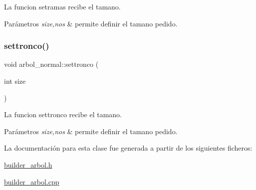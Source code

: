 La funcion setramas recibe el tamano. 
\begin{DoxyParams}{Parámetros}
{\em size,nos} & permite definir el tamano pedido. \\
\hline
\end{DoxyParams}
\mbox{\label{classarbol__normal_a6f761bf112224d0478b63935a591d91c}} 
\subsubsection{\texorpdfstring{settronco()}{settronco()}}
{\footnotesize\ttfamily void arbol\+\_\+normal\+::settronco (\begin{DoxyParamCaption}\item[{int}]{size }\end{DoxyParamCaption})}

La funcion settronco recibe el tamano. 
\begin{DoxyParams}{Parámetros}
{\em size,nos} & permite definir el tamano pedido. \\
\hline
\end{DoxyParams}


La documentación para esta clase fue generada a partir de los siguientes ficheros\+:\begin{DoxyCompactItemize}
\item 
\hyperlink{builder__arbol_8h}{builder\+\_\+arbol.\+h}\item 
\hyperlink{builder__arbol_8cpp}{builder\+\_\+arbol.\+cpp}\end{DoxyCompactItemize}
